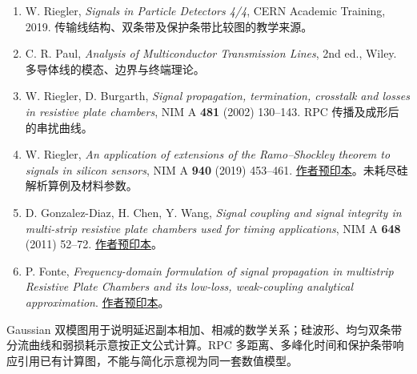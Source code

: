 \documentclass[
  11pt,
  a4paper,
  oneside,
  openany]{report}
\providecommand{\tightlist}{%
  \setlength{\itemsep}{0pt}\setlength{\parskip}{0pt}}
\numberwithin{equation}{chapter}
\begin{document}
\begin{enumerate}
\def\labelenumi{\arabic{enumi}.}
\tightlist
\item
  W. Riegler, \emph{Signals in Particle Detectors 4/4}, CERN Academic
  Training, 2019. 传输线结构、双条带及保护条带比较图的教学来源。
\item
  C. R. Paul, \emph{Analysis of Multiconductor Transmission Lines}, 2nd
  ed., Wiley. 多导体线的模态、边界与终端理论。
\item
  W. Riegler, D. Burgarth, \emph{Signal propagation, termination,
  crosstalk and losses in resistive plate chambers}, NIM A \textbf{481}
  (2002) 130--143. RPC 传播及成形后的串扰曲线。
\item
  W. Riegler, \emph{An application of extensions of the Ramo--Shockley
  theorem to signals in silicon sensors}, NIM A \textbf{940} (2019)
  453--461.
  \href{https://arxiv.org/abs/1812.07570}{作者预印本}。未耗尽硅解析算例及材料参数。
\item
  D. Gonzalez-Diaz, H. Chen, Y. Wang, \emph{Signal coupling and signal
  integrity in multi-strip resistive plate chambers used for timing
  applications}, NIM A \textbf{648} (2011) 52--72.
  \href{https://arxiv.org/abs/1102.1389}{作者预印本}。
\item
  P. Fonte, \emph{Frequency-domain formulation of signal propagation in
  multistrip Resistive Plate Chambers and its low-loss, weak-coupling
  analytical approximation}.
  \href{https://arxiv.org/abs/1301.1906}{作者预印本}。
\end{enumerate}

Gaussian
双模图用于说明延迟副本相加、相减的数学关系；硅波形、均匀双条带分流曲线和弱损耗示意按正文公式计算。RPC
多距离、多峰化时间和保护条带响应引用已有计算图，不能与简化示意视为同一套数值模型。
\end{document}
